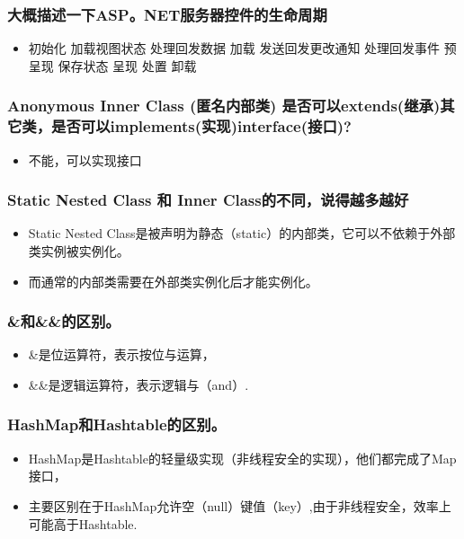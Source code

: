 \documentclass[9pt, b5paper]{article}
\begin{document}
\subsubsection{大概描述一下ASP。NET服务器控件的生命周期}
\label{sec-1-1-110}
\begin{itemize}
\item 初始化 加载视图状态 处理回发数据 加载 发送回发更改通知 处理回发事件 预呈现 保存状态 呈现 处置 卸载
\end{itemize}
\subsubsection{Anonymous Inner Class (匿名内部类) 是否可以extends(继承)其它类，是否可以implements(实现)interface(接口)?}
\label{sec-1-1-111}
\begin{itemize}
\item 不能，可以实现接口
\end{itemize}
\subsubsection{Static Nested Class 和 Inner Class的不同，说得越多越好}
\label{sec-1-1-112}
\begin{itemize}
\item Static Nested Class是被声明为静态（static）的内部类，它可以不依赖于外部类实例被实例化。
\item 而通常的内部类需要在外部类实例化后才能实例化。
\end{itemize}
\subsubsection{\&和\&\&的区别。}
\label{sec-1-1-113}
\begin{itemize}
\item \&是位运算符，表示按位与运算，
\item \&\&是逻辑运算符，表示逻辑与（and）.
\end{itemize}
\subsubsection{HashMap和Hashtable的区别。}
\label{sec-1-1-114}
\begin{itemize}
\item HashMap是Hashtable的轻量级实现（非线程安全的实现），他们都完成了Map接口，
\item 主要区别在于HashMap允许空（null）键值（key）,由于非线程安全，效率上可能高于Hashtable.
\end{itemize}
\end{document}
